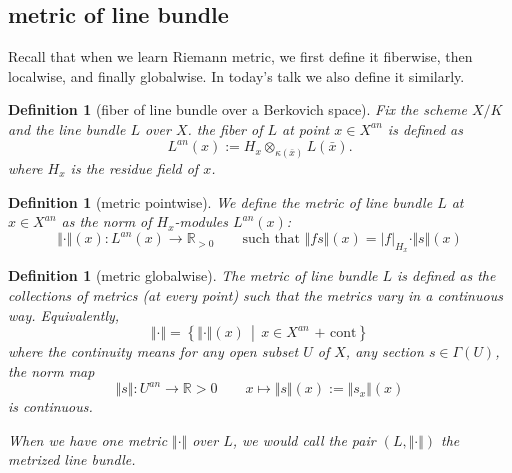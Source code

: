 \documentclass[reqno,11pt]{amsart}
\numberwithin{equation}{section}
\theoremstyle{plain}
\newtheorem{defn}[theorem]{Definition}
\theoremstyle{plain}
\numberwithin{equation}{section}
\theoremstyle{remark}
\newcommand{\norm}[1]{\Vert{#1}\Vert}
\begin{document}
\subsection{metric of line bundle}
Recall that when we learn Riemann metric, we first define it fiberwise, then localwise, and finally globalwise. In today's talk we also define it similarly.

\begin{defn}[fiber of line bundle over a Berkovich space]
Fix the scheme $X/K$ and the line bundle $L$ over $X$. the fiber of $L$ at point $x \in X^{an}$ is defined as
$$L^{an}(x):= H_x \otimes_{\kappa(\bar{x}) }L(\bar{x}).$$
where $H_x$ is the residue field of $x$.
\end{defn}
\begin{center}

\end{center}
\begin{defn}[metric pointwise]
We define the metric of line bundle $L$ at $x \in X^{an}$ as the norm of $H_x$-modules $L^{an}(x)$:
$$\norm{\cdot}(x):L^{an}(x) \longrightarrow \mathbb{R}_{>0} \qquad \text{such that }\norm{fs}(x)=|f|_{H_x} \cdot\norm{s}(x) $$
\end{defn}
\begin{defn}[metric globalwise]
The metric of line bundle $L$ is defined as the collections of metrics (at every point) such that the metrics vary in a continuous way. Equivalently,
$$\norm{\cdot}=\left\{ \norm{\cdot}(x)\, \middle|\, x\in X^{an} \text{ + cont} \right\}$$
where the continuity means for any open subset $U$ of $X$, any section $s \in \Gamma(U)$, the norm map
$$\norm{s}: U^{an} \longrightarrow \mathbb{R}>0 \qquad x \longmapsto \norm{s}(x):=\norm{s_x}(x)$$
is continuous.

When we have one metric $\norm{\cdot}$ over $L$, we would call the pair $(L,\norm{\cdot})$ the metrized line bundle.
\end{defn}
\end{document}
